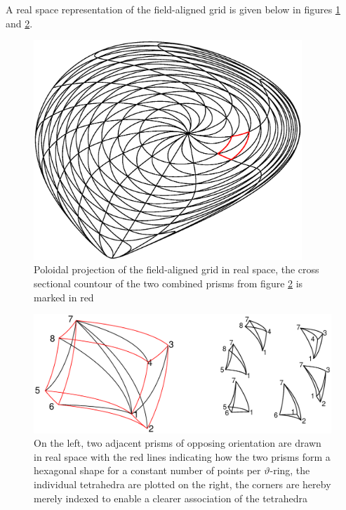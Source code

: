 \documentclass[./main.tex]{subfiles}
\begin{document}
A real space representation of the field-aligned grid is given below in figures \ref{fig:Curvilinear_grid} and \ref{fig:Curvilinear_grid_and_tetrahedra}.
\begin{figure}[ht!]
	\includegraphics[width=0.9\textwidth]{figures/Curvilinear_grid.eps}
	\caption{Poloidal projection of the field-aligned grid in real space, the cross sectional countour of the two combined prisms from figure \ref{fig:Curvilinear_grid_and_tetrahedra} is marked in red}
	\label{fig:Curvilinear_grid}
\end{figure}
\begin{figure}[hb!]
	\includegraphics[width=1\textwidth]{figures/Curvilinear_grid_prisms_tetra.eps}
	\caption{On the left, two adjacent prisms of opposing orientation are drawn in real space with the red lines indicating how the two prisms form a hexagonal shape for a constant number of points per $\vartheta$-ring, the individual tetrahedra are plotted on the right, the corners are hereby merely indexed to enable a clearer association of the tetrahedra}
	\label{fig:Curvilinear_grid_and_tetrahedra}
\end{figure}
\end{document}
